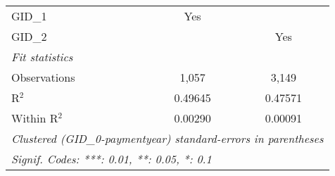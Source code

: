 \begin{tabular}{lcc}
   GID\_1                                                   & Yes      & \\  
   GID\_2                                                   &          & Yes\\  
   \midrule
   \emph{Fit statistics}\\
   Observations                                             & 1,057    & 3,149\\  
   R$^2$                                                    & 0.49645  & 0.47571\\  
   Within R$^2$                                             & 0.00290  & 0.00091\\  
   \midrule \midrule
   \multicolumn{3}{l}{\emph{Clustered (GID\_0-paymentyear) standard-errors in parentheses}}\\
   \multicolumn{3}{l}{\emph{Signif. Codes: ***: 0.01, **: 0.05, *: 0.1}}\\
\end{tabular}
\par\endgroup


